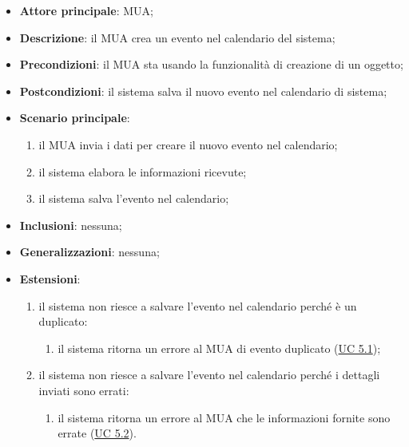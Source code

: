    \begin{itemize}
        \item \textbf{Attore principale}: MUA;
        \item \textbf{Descrizione}: il MUA crea un evento nel calendario del sistema;
        \item \textbf{Precondizioni}: il MUA sta usando la funzionalità di creazione di un oggetto;
        \item \textbf{Postcondizioni}: il sistema salva il nuovo evento nel calendario di sistema;
        \item \textbf{Scenario principale}:
            \begin{enumerate}
                \item il MUA invia i dati per creare il nuovo evento nel calendario;
                \item il sistema elabora le informazioni ricevute;
                \item il sistema salva l'evento nel calendario;
            \end{enumerate}
        \item \textbf{Inclusioni}: nessuna;
        \item \textbf{Generalizzazioni}: nessuna;
        \item \textbf{Estensioni}:
            \begin{enumerate}[label=\alph*.]
                \item il sistema non riesce a salvare l'evento nel calendario perché è un duplicato:
                \begin{enumerate}[label=\arabic*.]
                    \item il sistema ritorna un errore al MUA di evento duplicato (\hyperref[sec:UC5.1]{UC 5.1});
                \end{enumerate}
                \item il sistema non riesce a salvare l'evento nel calendario perché i dettagli inviati sono errati:
                \begin{enumerate}[label=\arabic*.]
                    \item il sistema ritorna un errore al MUA che le informazioni fornite sono errate (\hyperref[sec:UC5.2]{UC 5.2}).
                \end{enumerate}
            \end{enumerate}
    \end{itemize}

